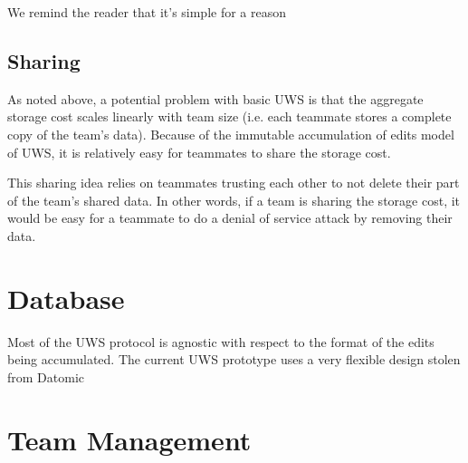 \documentclass{article}
\begin{document}
We remind the reader that it's simple for a reason

\subsection{Sharing}

As noted above, a potential problem with basic UWS is that the aggregate storage cost scales linearly with team size (i.e. each teammate stores a complete copy of the team's data).
Because of the immutable accumulation of edits model of UWS, it is relatively easy for teammates to share the storage cost.

This sharing idea relies on teammates trusting each other to not delete their part of the team's shared data.
In other words, if a team is sharing the storage cost, it would be easy for a teammate to do a denial of service attack by removing their data.

\section{Database}

Most of the UWS protocol is agnostic with respect to the format of the edits being accumulated.
The current UWS prototype uses a very flexible design stolen from Datomic

\section{Team Management}
\end{document}
